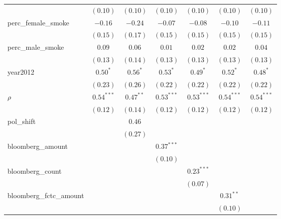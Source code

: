 \begin{table}[!h]
\begin{center}
\begin{tabular}{l c c c c c c }
                        & $(0.10)$     & $(0.10)$     & $(0.10)$     & $(0.10)$     & $(0.10)$     & $(0.10)$     \\
perc\_female\_smoke     & $-0.16$      & $-0.24$      & $-0.07$      & $-0.08$      & $-0.10$      & $-0.11$      \\
                        & $(0.15)$     & $(0.17)$     & $(0.15)$     & $(0.15)$     & $(0.15)$     & $(0.15)$     \\
perc\_male\_smoke       & $0.09$       & $0.06$       & $0.01$       & $0.02$       & $0.02$       & $0.04$       \\
                        & $(0.13)$     & $(0.14)$     & $(0.13)$     & $(0.13)$     & $(0.13)$     & $(0.13)$     \\
year2012                & $0.50^{*}$   & $0.56^{*}$   & $0.53^{*}$   & $0.49^{*}$   & $0.52^{*}$   & $0.48^{*}$   \\
                        & $(0.23)$     & $(0.26)$     & $(0.22)$     & $(0.22)$     & $(0.22)$     & $(0.22)$     \\
$\rho$                  & $0.54^{***}$ & $0.47^{**}$  & $0.53^{***}$ & $0.53^{***}$ & $0.54^{***}$ & $0.54^{***}$ \\
                        & $(0.12)$     & $(0.14)$     & $(0.12)$     & $(0.12)$     & $(0.12)$     & $(0.12)$     \\
pol\_shift              &              & $0.46$       &              &              &              &              \\
                        &              & $(0.27)$     &              &              &              &              \\
bloomberg\_amount       &              &              & $0.37^{***}$ &              &              &              \\
                        &              &              & $(0.10)$     &              &              &              \\
bloomberg\_count        &              &              &              & $0.23^{***}$ &              &              \\
                        &              &              &              & $(0.07)$     &              &              \\
bloomberg\_fctc\_amount &              &              &              &              & $0.31^{**}$  &              \\
                        &              &              &              &              & $(0.10)$     &              \\

\end{tabular}
\end{center}
\end{table}
